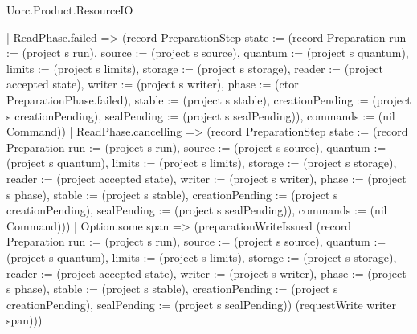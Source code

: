 \begin{lexlean}{Uorc.Product.ResourceIO}
\begin{semanticmodule}
{      | ReadPhase.failed => (record PreparationStep {state := (record Preparation {run := (project s run), source := (project s source), quantum := (project s quantum), limits := (project s limits), storage := (project s storage), reader := (project accepted state), writer := (project s writer), phase := (ctor PreparationPhase.failed), stable := (project s stable), creationPending := (project s creationPending), sealPending := (project s sealPending)}), commands := (nil Command)})
      | ReadPhase.cancelling => (record PreparationStep {state := (record Preparation {run := (project s run), source := (project s source), quantum := (project s quantum), limits := (project s limits), storage := (project s storage), reader := (project accepted state), writer := (project s writer), phase := (project s phase), stable := (project s stable), creationPending := (project s creationPending), sealPending := (project s sealPending)}), commands := (nil Command)}))
    | Option.some span => (preparationWriteIssued (record Preparation {run := (project s run), source := (project s source), quantum := (project s quantum), limits := (project s limits), storage := (project s storage), reader := (project accepted state), writer := (project s writer), phase := (project s phase), stable := (project s stable), creationPending := (project s creationPending), sealPending := (project s sealPending)}) (requestWrite writer span)))
}


\end{semanticmodule}
\end{lexlean}
